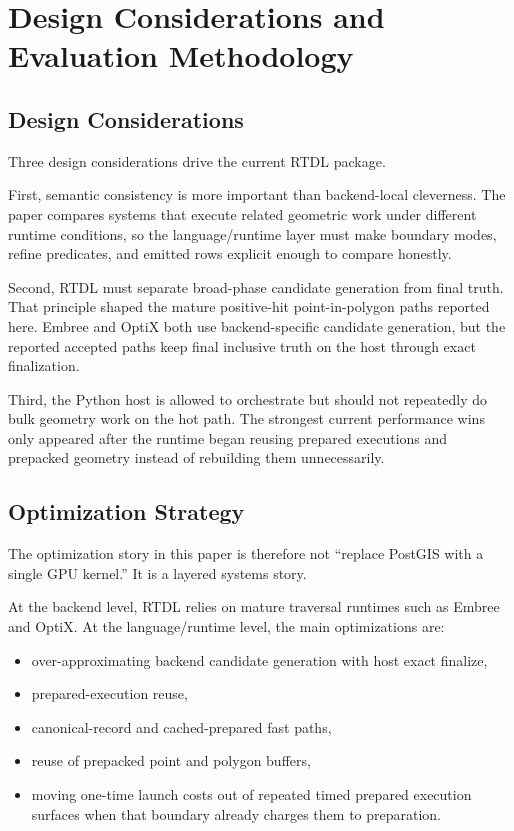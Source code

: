 \documentclass[conference]{IEEEtran}
\begin{document}
\section{Design Considerations and Evaluation Methodology}

\subsection{Design Considerations}

Three design considerations drive the current RTDL package.

First, semantic consistency is more important than backend-local cleverness.
The paper compares systems that execute related geometric work under different
runtime conditions, so the language/runtime layer must make boundary modes,
refine predicates, and emitted rows explicit enough to compare honestly.

Second, RTDL must separate broad-phase candidate generation from final truth.
That principle shaped the mature positive-hit point-in-polygon paths reported
here. Embree and OptiX both use backend-specific candidate generation, but the
reported accepted paths keep final inclusive truth on the host through exact
finalization.

Third, the Python host is allowed to orchestrate but should not repeatedly do
bulk geometry work on the hot path. The strongest current performance wins only
appeared after the runtime began reusing prepared executions and prepacked
geometry instead of rebuilding them unnecessarily.

\subsection{Optimization Strategy}

The optimization story in this paper is therefore not ``replace PostGIS with a
single GPU kernel.'' It is a layered systems story.

At the backend level, RTDL relies on mature traversal runtimes such as Embree
and OptiX. At the language/runtime level, the main optimizations are:

\begin{itemize}
\item over-approximating backend candidate generation with host exact finalize,
\item prepared-execution reuse,
\item canonical-record and cached-prepared fast paths,
\item reuse of prepacked point and polygon buffers,
\item moving one-time launch costs out of repeated timed prepared execution
surfaces when that boundary already charges them to preparation.
\end{itemize}
\end{document}
